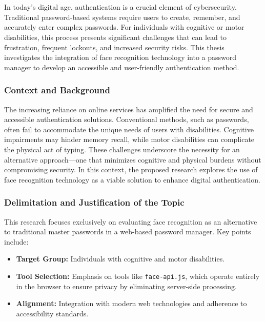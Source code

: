 
\chapter{}%
\label{ch:inleiding}

In today's digital age, authentication is a crucial element of cybersecurity. Traditional password-based systems require users to create, remember, and accurately enter complex passwords. For individuals with cognitive or motor disabilities, this process presents significant challenges that can lead to frustration, frequent lockouts, and increased security risks. This thesis investigates the integration of face recognition technology into a password manager to develop an accessible and user-friendly authentication method.

\subsection{Context and Background}
The increasing reliance on online services has amplified the need for secure and accessible authentication solutions. Conventional methods, such as passwords, often fail to accommodate the unique needs of users with disabilities. Cognitive impairments may hinder memory recall, while motor disabilities can complicate the physical act of typing. These challenges underscore the necessity for an alternative approach—one that minimizes cognitive and physical burdens without compromising security. In this context, the proposed research explores the use of face recognition technology as a viable solution to enhance digital authentication.

\subsection{Delimitation and Justification of the Topic}
This research focuses exclusively on evaluating face recognition as an alternative to traditional master passwords in a web-based password manager. Key points include:
\begin{itemize}
  \item \textbf{Target Group:} Individuals with cognitive and motor disabilities.
  \item \textbf{Tool Selection:} Emphasis on tools like \texttt{face-api.js}, which operate entirely in the browser to ensure privacy by eliminating server-side processing.
  \item \textbf{Alignment:} Integration with modern web technologies and adherence to accessibility standards.
\end{itemize}

